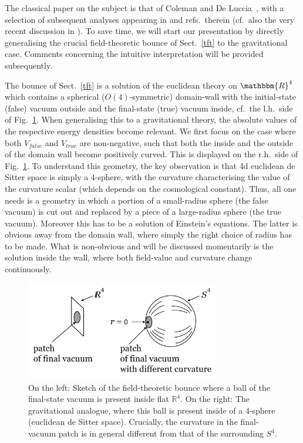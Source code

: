 \documentclass[12pt]{article}
\numberwithin{equation}{section}
\begin{document}
The classical paper on the subject is that of Coleman and De Luccia~\cite{Coleman:1980aw}, with a selection of subsequent analyses appearing in \cite{Parke:1982pm, Lindley:1984bj, Brown:1987dd, Lee:1987qc, SchwartzPerlov:2006hi, Johnson:2007jla} and refs.~therein (cf.~also the very recent discussion in \cite{Eckerle:2020opg}). To save time, we will start our presentation by directly generalising the crucial field-theoretic bounce of Sect.~\ref{tft} to the gravitational case. Comments concerning the intuitive interpretation will be provided subsequently.

The bounce of Sect.~\ref{tft} is a solution of the euclidean theory on $\mathbbm{R}^4$ which contains a spherical ($O(4)$-symmetric) domain-wall with the initial-state (false) vacuum outside and the final-state (true) vacuum inside, cf.~the l.h.~side of Fig.~\ref{cdl}. When generalising this to a gravitational theory, the absolute values of the respective energy densities become relevant. We first focus on the case where both $V_{false}$ and $V_{true}$ are non-negative, such that both the inside and the outside of the domain wall become positively curved. This is displayed on the r.h.~side of Fig.~\ref{cdl}. To understand this geometry, the key observation is that 4d euclidean de Sitter space is simply a 4-sphere, with the curvature characterising the value of the curvature scalar (which depends on the cosmological constant). Thus, all one needs is a geometry in which a portion of a small-radius sphere (the false vacuum) is cut out and replaced by a piece of a large-radius sphere (the true vacuum). Moreover this has to be a solution of Einstein's equations. The latter is obvious away from the domain wall, where simply the right choice of radius has to be made. What is non-obvious and will be discussed momentarily is the solution inside the wall, where both field-value and curvature change continuously.

\begin{figure}[ht]
\begin{center} 
\includegraphics[width=8.5cm]{cdl.png}
\caption{On the left: Sketch of the field-theoretic bounce where a ball of the final-state vacuum is present inside flat $\mathbb{R}^4$. On the right: The gravitational analogue, where this ball is present inside of a 4-sphere (euclidean de Sitter space). Crucially, the curvature in the final-vacuum patch is in general different from that of the surrounding $S^4$.}
\label{cdl} 
\end{center}
\end{figure}
\end{document}
